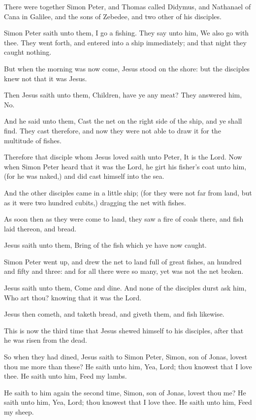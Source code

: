 \Verse There were together Simon Peter, and Thomas called Didymus, and Nathanael of Cana in Galilee, and the sons of Zebedee, and two other of his disciples.

\Verse Simon Peter saith unto them, I go a fishing. They say unto him, We also go with thee. They went forth, and entered into a ship immediately; and that night they caught nothing.

\Verse But when the morning was now come, Jesus stood on the shore: but the disciples knew not that it was Jesus.

\Verse Then Jesus saith unto them, Children, have ye any meat? They answered him, No.

\Verse And he said unto them, Cast the net on the right side of the ship, and ye shall find. They cast therefore, and now they were not able to draw it for the multitude of fishes.

\Verse Therefore that disciple whom Jesus loved saith unto Peter, It is the Lord. Now when Simon Peter heard that it was the Lord, he girt his fisher's coat unto him, (for he was naked,) and did cast himself into the sea.

\Verse And the other disciples came in a little ship; (for they were not far from land, but as it were two hundred cubits,) dragging the net with fishes.

\Verse As soon then as they were come to land, they saw a fire of coals there, and fish laid thereon, and bread.

\Verse Jesus saith unto them, Bring of the fish which ye have now caught.

\Verse Simon Peter went up, and drew the net to land full of great fishes, an hundred and fifty and three: and for all there were so many, yet was not the net broken.

\Verse Jesus saith unto them, Come and dine. And none of the disciples durst ask him, Who art thou? knowing that it was the Lord.

\Verse Jesus then cometh, and taketh bread, and giveth them, and fish likewise.

\Verse This is now the third time that Jesus shewed himself to his disciples, after that he was risen from the dead.

\Verse So when they had dined, Jesus saith to Simon Peter, Simon, son of Jonas, lovest thou me more than these? He saith unto him, Yea, Lord; thou knowest that I love thee. He saith unto him, Feed my lambs.

\Verse He saith to him again the second time, Simon, son of Jonas, lovest thou me? He saith unto him, Yea, Lord; thou knowest that I love thee. He saith unto him, Feed my sheep.


